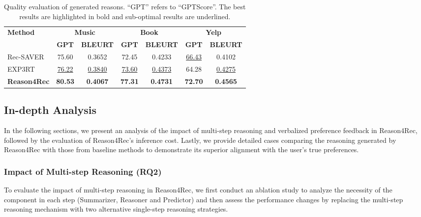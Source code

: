 \begin{table}[t!]
\setlength\abovecaptionskip{-0.3px}
\setlength\belowcaptionskip{-0.3px}
\setlength{\tabcolsep}{0.6mm}
\centering
\caption{Quality evaluation of generated reasons. ``GPT'' refers to ``GPTScore''. The best results are highlighted
in bold and sub-optimal results are underlined.}
\begin{tabular}{lcccccc}
\toprule
\multirow{2}{*}{\textbf{Method}} & \multicolumn{2}{c}{\textbf{Music}} & \multicolumn{2}{c}{\textbf{Book}} & \multicolumn{2}{c}{\textbf{Yelp}} \\
\cmidrule(lr){2-3} \cmidrule(lr){4-5} \cmidrule(lr){6-7}
& \textbf{GPT} & \textbf{BLEURT} & \textbf{GPT} & \textbf{BLEURT} & \textbf{GPT} & \textbf{BLEURT} \\
\midrule
Rec-SAVER & 75.60 & 0.3652 & 72.45 & 0.4233 & \underline{66.43} & 0.4102 \\
EXP3RT & \underline{76.22} & \underline{0.3840} & \underline{73.60} & \underline{0.4373} & 64.28 & \underline{0.4275} \\
\textbf{Reason4Rec} & \textbf{80.53} & \textbf{0.4067} & \textbf{77.31} & \textbf{0.4731} & \textbf{72.70} & \textbf{0.4565} \\
\bottomrule
\end{tabular}
\label{tab:quality_eval}
\end{table}





  


\subsection{In-depth Analysis}
In the following sections, we present an analysis of the impact of multi-step reasoning and verbalized preference feedback in Reason4Rec,  followed by the evaluation of Reason4Rec's inference cost.
Lastly, we provide detailed cases comparing the reasoning generated by Reason4Rec with those from baseline methods to demonstrate its superior alignment with the user's true preferences.

\subsubsection{\textbf{Impact of Multi-step Reasoning  (RQ2)}} \label{sec:each_step_important}
To evaluate the impact of multi-step reasoning in Reason4Rec, we first conduct an ablation study to analyze the necessity of the component in each step (\ie Summarizer, Reasoner and Predictor) and then assess the performance changes by replacing the multi-step reasoning mechanism with two alternative single-step reasoning strategies.


